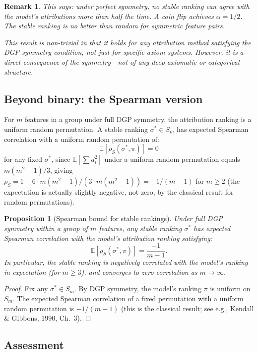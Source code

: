 \documentclass{article}
\newtheorem{proposition}[theorem]{Proposition}
\newtheorem{remark}[theorem]{Remark}
\begin{document}
\begin{remark}
This says: under perfect symmetry, no stable ranking can agree
with the model's attributions more than half the time. A coin
flip achieves $\alpha = 1/2$. The stable ranking is no better
than random for symmetric feature pairs.

This result is non-trivial in that it holds for \emph{any}
attribution method satisfying the DGP symmetry condition, not
just for specific axiom systems. However, it is a direct
consequence of the symmetry---not of any deep axiomatic or
categorical structure.
\end{remark}

\subsection{Beyond binary: the Spearman version}

For $m$ features in a group under full DGP symmetry, the
attribution ranking is a uniform random permutation. A stable
ranking $\sigma^* \in S_m$ has expected Spearman correlation
with a uniform random permutation of:
\[
    \mathbb{E}[\rho_S(\sigma^*, \pi)] = 0
\]
for any fixed $\sigma^*$, since $\mathbb{E}[\sum d_i^2]$
under a uniform random permutation equals $m(m^2 - 1)/3$,
giving $\rho_S = 1 - 6 \cdot m(m^2-1)/(3 \cdot m(m^2-1)) = -1/(m-1)$
for $m \geq 2$ (the expectation is actually slightly negative,
not zero, by the classical result for random permutations).

\begin{proposition}[Spearman bound for stable rankings]
\label{prop:spearman-stable}
Under full DGP symmetry within a group of $m$ features, any
stable ranking $\sigma^*$ has expected Spearman correlation with
the model's attribution ranking satisfying:
\[
    \mathbb{E}[\rho_S(\sigma^*, \pi)] = \frac{-1}{m - 1}.
\]
In particular, the stable ranking is \emph{negatively correlated}
with the model's ranking in expectation (for $m \geq 3$), and
converges to zero correlation as $m \to \infty$.
\end{proposition}

\begin{proof}
Fix any $\sigma^* \in S_m$. By DGP symmetry, the model's
ranking $\pi$ is uniform on $S_m$. The expected Spearman
correlation of a fixed permutation with a uniform random
permutation is $-1/(m-1)$ (this is the classical result;
see e.g., Kendall \& Gibbons, 1990, Ch.~3).
\end{proof}

\subsection{Assessment}
\end{document}
